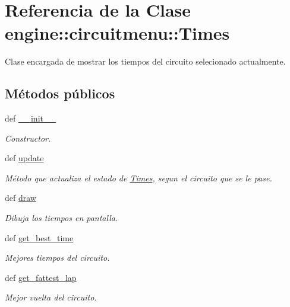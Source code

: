\hypertarget{classengine_1_1circuitmenu_1_1Times}{
\section{\-Referencia de la \-Clase engine\-:\-:circuitmenu\-:\-:\-Times}
\label{classengine_1_1circuitmenu_1_1Times}
}


\-Clase encargada de mostrar los tiempos del circuito selecionado actualmente.  


\subsection*{\-Métodos públicos}
\begin{DoxyCompactItemize}
\item 
def \hyperlink{classengine_1_1circuitmenu_1_1Times_a659e6d20195c64913c23490f313dd895}{\-\_\-\-\_\-init\-\_\-\-\_\-}
\begin{DoxyCompactList}\small\item\em \-Constructor. \end{DoxyCompactList}\item 
def \hyperlink{classengine_1_1circuitmenu_1_1Times_a52254f1b1a3fca8d0bea11c08c282bc8}{update}
\begin{DoxyCompactList}\small\item\em \-Método que actualiza el estado de \hyperlink{classengine_1_1circuitmenu_1_1Times}{\-Times}, segun el circuito que se le pase. \end{DoxyCompactList}\item 
def \hyperlink{classengine_1_1circuitmenu_1_1Times_ad15009d55d72563b3b0c904a19944b8b}{draw}
\begin{DoxyCompactList}\small\item\em \-Dibuja los tiempos en pantalla. \end{DoxyCompactList}\item 
\hypertarget{classengine_1_1circuitmenu_1_1Times_a60f73d06721565059b9dda7bb9aa754c}{
def \hyperlink{classengine_1_1circuitmenu_1_1Times_a60f73d06721565059b9dda7bb9aa754c}{get\-\_\-best\-\_\-time}}
\label{classengine_1_1circuitmenu_1_1Times_a60f73d06721565059b9dda7bb9aa754c}

\begin{DoxyCompactList}\small\item\em \-Mejores tiempos del circuito. \end{DoxyCompactList}\item 
\hypertarget{classengine_1_1circuitmenu_1_1Times_a4e3f5512ea7075c61d8c172d3df6de2b}{
def \hyperlink{classengine_1_1circuitmenu_1_1Times_a4e3f5512ea7075c61d8c172d3df6de2b}{get\-\_\-fattest\-\_\-lap}}
\label{classengine_1_1circuitmenu_1_1Times_a4e3f5512ea7075c61d8c172d3df6de2b}

\begin{DoxyCompactList}\small\item\em \-Mejor vuelta del circuito. \end{DoxyCompactList}\end{DoxyCompactItemize}
